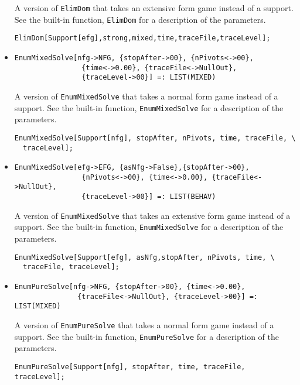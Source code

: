\begin{itemize}
\bd 
A version of \verb+ElimDom+ that takes an extensive form game instead
of a support.  See the built-in function, \verb+ElimDom+ for a
description of the parameters.
\begin{verbatim}
ElimDom[Support[efg],strong,mixed,time,traceFile,traceLevel];
\end{verbatim} 
\ed

\item{}
\protect \large \begin{verbatim}
EnumMixedSolve[nfg->NFG, {stopAfter->00}, {nPivots<->00}, 
                {time<->0.00}, {traceFile<->NullOut}, 
                {traceLevel->00}] =: LIST(MIXED)
\end{verbatim}\normalsize

\bd 
A version of \verb+EnumMixedSolve+ that takes a normal form game instead
of a support.  See the built-in function, \verb+EnumMixedSolve+ for a
description of the parameters.
\begin{verbatim}
EnumMixedSolve[Support[nfg], stopAfter, nPivots, time, traceFile, \
  traceLevel];
\end{verbatim} 
\ed

\item{}
\protect \large \begin{verbatim}
EnumMixedSolve[efg->EFG, {asNfg->False},{stopAfter->00},
                {nPivots<->00}, {time<->0.00}, {traceFile<->NullOut}, 
                {traceLevel->00}] =: LIST(BEHAV)
\end{verbatim}\normalsize

\bd 
A version of \verb+EnumMixedSolve+ that takes an extensive form game instead
of a support.  See the built-in function, \verb+EnumMixedSolve+ for a
description of the parameters.
\begin{verbatim}
EnumMixedSolve[Support[efg], asNfg,stopAfter, nPivots, time, \
  traceFile, traceLevel];
\end{verbatim} 
\ed

\item{}
\protect \large \begin{verbatim}
EnumPureSolve[nfg->NFG, {stopAfter->00}, {time<->0.00}, 
               {traceFile<->NullOut}, {traceLevel->00}] =: LIST(MIXED)
\end{verbatim}\normalsize

\bd 
A version of \verb+EnumPureSolve+ that takes a normal form game instead
of a support.  See the built-in function, \verb+EnumPureSolve+ for a
description of the parameters.
\begin{verbatim}
EnumPureSolve[Support[nfg], stopAfter, time, traceFile, traceLevel];
\end{verbatim} 
\ed


\end{itemize}
